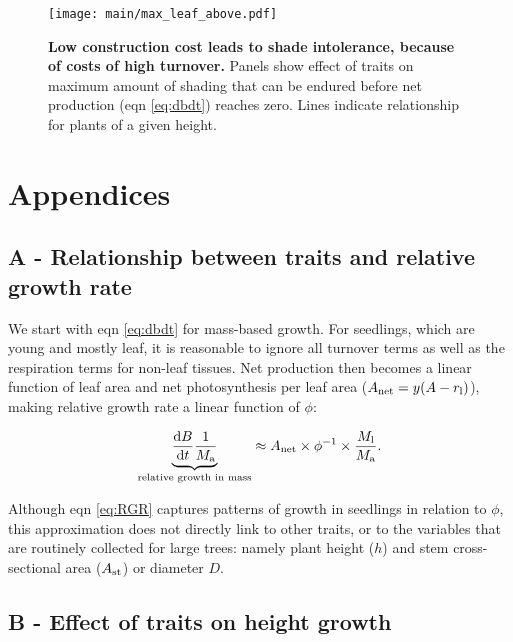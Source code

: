 \documentclass[a4paper,11pt]{article}
\begin{document}
\begin{figure}[ht]
\centering
\texttt{[image: main/max\_leaf\_above.pdf]}
\caption{\textbf{Low construction cost leads to shade intolerance,
because of costs of high turnover.} Panels show effect of traits on
maximum amount of shading that can be endured before net production (eqn
\ref{eq:dbdt}) reaches zero. Lines indicate relationship for plants of a
given height. \label{fig:wplcp}}
\end{figure}

\clearpage

\section{Appendices}
\subsection{A - Relationship between traits and relative growth rate} \label{app:traits-RGR}

We start with eqn \ref{eq:dbdt} for mass-based growth. For seedlings, which are
young and mostly leaf, it is reasonable to ignore all turnover terms as
well as the respiration terms for non-leaf tissues. Net production then
becomes a linear function of leaf area and net photosynthesis per leaf
area ($A_\textrm{net} = y(A - r_{\rm l})$), making relative growth
rate a linear function of $\phi$:

\begin{equation}\label{eq:RGR}
\underbrace{\strut\frac{{\rm d}B}{{\rm d}t}\frac{1}{M_{\rm a}}}_\textrm{relative growth in mass}  \approx A_\textrm{net} \times \phi^{-1} \times \frac{M_{\rm l}}{M_{\rm a}}. \end{equation}

Although eqn \ref{eq:RGR} captures patterns of growth in seedlings in
relation to $\phi$\citep{Wright-2000}, this
approximation does not directly link to other traits, or to the
variables that are routinely collected for large trees: namely plant
height ($h$) and stem cross-sectional area ($A_{\rm st}$) or
diameter $D$.

\subsection{B - Effect of traits on height growth} \label{app:traits-RGR}
\end{document}
